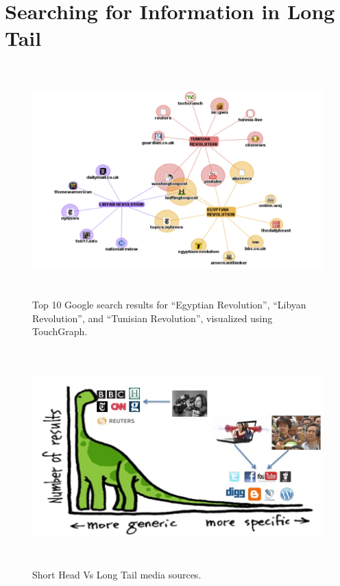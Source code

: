 \section{Searching for Information in Long Tail}

\begin{figure}[htbp]
\centering
\includegraphics[height=3.5in,width=4.5in]{Figures/Chapter3Figures/touchgraph.jpg} 

\caption{\small Top 10 Google search results for ``Egyptian Revolution'', ``Libyan Revolution'', and ``Tunisian Revolution'', visualized using TouchGraph.}

\label{fg:touchgraph}

\end{figure}

\begin{figure}[htb]
\centering
\includegraphics[height=3.3in,width=4.8in]{Figures/Chapter3Figures/LongTailVsShortHead.jpg} 

\caption{\small Short Head Vs Long Tail media sources.}

\label{fg:longvsshort}

\end{figure}


